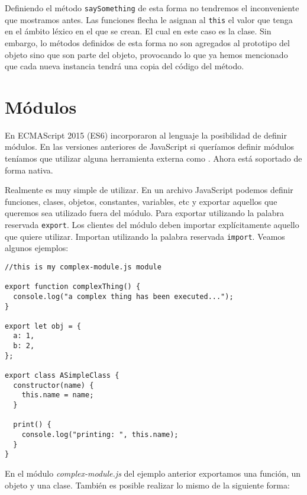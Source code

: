 \documentclass[a4paper, oneside, titlepage, 12pt]{paper}
\begin{document}
Definiendo el método \texttt{saySomething} de esta forma no tendremos el inconveniente que mostramos antes. Las funciones flecha le asignan al \texttt{this} el valor que tenga en el ámbito léxico en el que se crean. El cual en este caso es la clase. Sin embargo, lo métodos definidos de esta forma no son agregados al prototipo del objeto sino que son parte del objeto, provocando lo que ya hemos mencionado que cada nueva instancia tendrá una copia del código del método.

\section{Módulos}

En ECMAScript 2015 (ES6) incorporaron al lenguaje la posibilidad de definir módulos. En las versiones anteriores de JavaScript si queríamos definir módulos teníamos que utilizar alguna herramienta externa como \cite{requirejs}. Ahora está soportado de forma nativa. 
\newline

Realmente es muy simple de utilizar. En un archivo JavaScript podemos definir funciones, clases, objetos, constantes, variables, etc y exportar aquellos que queremos sea utilizado fuera del módulo. Para exportar utilizando la palabra reservada \texttt{export}. Los clientes del módulo deben importar explícitamente aquello que quiere utilizar. Importan utilizando la palabra reservada \texttt{import}. Veamos algunos ejemplos:
 
\begin{verbatim}
//this is my complex-module.js module

export function complexThing() {
  console.log("a complex thing has been executed...");
}

export let obj = {
  a: 1,
  b: 2,
};

export class ASimpleClass {
  constructor(name) {
    this.name = name;
  }

  print() {
    console.log("printing: ", this.name);
  }
}
\end{verbatim}

En el módulo \textit{complex-module.js} del ejemplo anterior exportamos una función, un objeto y una clase. También es posible realizar lo mismo de la siguiente forma:
\end{document}
